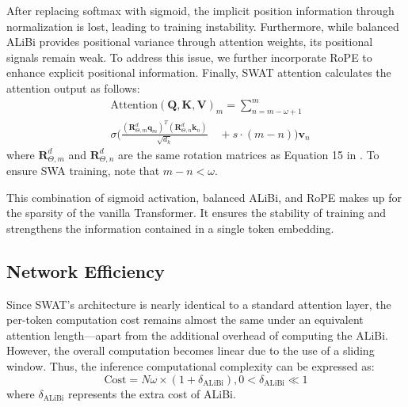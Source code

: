 After replacing softmax with sigmoid, the implicit position information through normalization is lost, leading to training instability. Furthermore, while balanced ALiBi provides positional variance through attention weights, its positional signals remain weak. To address this issue, we further incorporate RoPE to enhance explicit positional information. Finally, SWAT attention calculates the attention output as follows:
\begin{equation}
    \begin{aligned}
        & \text{Attention}(\boldsymbol{Q}, \boldsymbol{K}, \boldsymbol{V})_m = {\textstyle \sum_{n=m-\omega+1}^{m}}  \\
        & \sigma \Bigg( 
        \frac{(\boldsymbol{R}_{\Theta, m}^d \boldsymbol{q}_m)^T (\boldsymbol{R}_{\Theta, n}^d \boldsymbol{k}_n)}
        {\sqrt{d_k}}  \quad + s \cdot (m-n) \Bigg) \boldsymbol{v}_n
    \end{aligned}
\end{equation}
where $\boldsymbol{R}_{\Theta, m}^d$ and $\boldsymbol{R}_{\Theta, n}^d$ are the same rotation matrices as Equation 15 in \cite{rope}. To ensure SWA training, note that $m-n < \omega$.

This combination of sigmoid activation, balanced ALiBi, and RoPE makes up for the sparsity of the vanilla Transformer. It ensures the stability of training and strengthens the information contained in a single token embedding.


\subsection{Network Efficiency}

Since SWAT's architecture is nearly identical to a standard attention layer, the per-token computation cost remains almost the same under an equivalent attention length—apart from the additional overhead of computing the ALiBi. However, the overall computation becomes linear due to the use of a sliding window. Thus, the inference computational complexity can be expressed as:
\begin{equation}
\mathrm{Cost} =N  \omega \times ( 1+\delta_{\text{ALiBi}}), 0 < \delta_{\text{ALiBi}} \ll 1
\end{equation}
where $\delta_{\text{ALiBi}}$ represents the extra cost of ALiBi.



